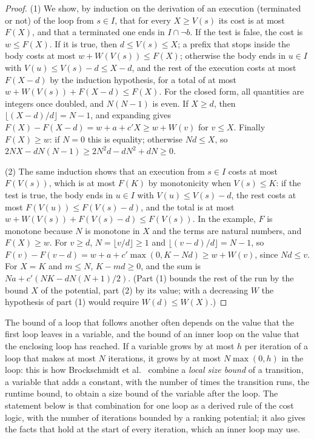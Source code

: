\documentclass[oneside,english]{amsart}
\numberwithin{equation}{section}
\numberwithin{figure}{section}
\theoremstyle{plain}
\theoremstyle{definition}
\theoremstyle{plain}
\theoremstyle{remark}
\theoremstyle{plain}
\theoremstyle{definition}
\theoremstyle{plain}
\theoremstyle{remark}
\begin{document}
\begin{proof}
(1) We show, by induction on the derivation of an execution (terminated or not) of the loop from $s \in I$, that for every $X \ge V(s)$ its cost is at most $F(X)$, and that a terminated one ends in $I \cap \neg b$. If the test is false, the cost is $w \le F(X)$. If it is true, then $d \le V(s) \le X$; a prefix that stops inside the body costs at most $w + W(V(s)) \le F(X)$; otherwise the body ends in $u \in I$ with $V(u) \le V(s) - d \le X - d$, and the rest of the execution costs at most $F(X - d)$ by the induction hypothesis, for a total of at most $w + W(V(s)) + F(X - d) \le F(X)$. For the closed form, all quantities are integers once doubled, and $N(N-1)$ is even. If $X \ge d$, then $\lfloor (X - d)/d \rfloor = N - 1$, and expanding gives $F(X) - F(X - d) = w + a + c' X \ge w + W(v)$ for $v \le X$. Finally $F(X) \ge w$: if $N = 0$ this is equality; otherwise $N d \le X$, so $2 N X - d N (N - 1) \ge 2 N^2 d - d N^2 + d N \ge 0$.

(2) The same induction shows that an execution from $s \in I$ costs at most $F(V(s))$, which is at most $F(K)$ by monotonicity when $V(s) \le K$: if the test is true, the body ends in $u \in I$ with $V(u) \le V(s) - d$, the rest costs at most $F(V(u)) \le F(V(s) - d)$, and the total is at most $w + W(V(s)) + F(V(s) - d) \le F(V(s))$. In the example, $F$ is monotone because $N$ is monotone in $X$ and the terms are natural numbers, and $F(X) \ge w$. For $v \ge d$, $N = \lfloor v/d \rfloor \ge 1$ and $\lfloor (v - d)/d \rfloor = N - 1$, so $F(v) - F(v - d) = w + a + c' \max(0, K - N d) \ge w + W(v)$, since $N d \le v$. For $X = K$ and $m \le N$, $K - m d \ge 0$, and the sum is $N a + c' (N K - d N (N + 1)/2)$. (Part (1) bounds the rest of the run by the bound $X$ of the potential, part (2) by its value; with a decreasing $W$ the hypothesis of part (1) would require $W(d) \le W(X)$.)
\end{proof}

The bound of a loop that follows another often depends on the value that the first loop leaves in a variable, and the bound of an inner loop on the value that the enclosing loop has reached. If a variable grows by at most $h$ per iteration of a loop that makes at most $N$ iterations, it grows by at most $N \max(0, h)$ in the loop: this is how Brockschmidt et al.\ \cite[Section~4.2]{brockschmidt2016analyzing} combine a \emph{local size bound} of a transition, a variable that adds a constant, with the number of times the transition runs, the runtime bound, to obtain a size bound of the variable after the loop. The statement below is that combination for one loop as a derived rule of the cost logic, with the number of iterations bounded by a ranking potential; it also gives the facts that hold at the start of every iteration, which an inner loop may use.
\end{document}
